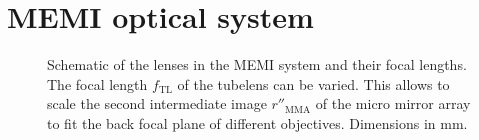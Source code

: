\section{MEMI optical system}
\begin{figure}
   \centering
   \def\svgscale{2}
   
   \caption{Schematic of the lenses in the MEMI system and their focal
     lengths. The focal length $f_\textrm{TL}$ of the tubelens can be
     varied. This allows to scale the second intermediate image
     $r''_\textrm{MMA}$ of the micro mirror array to fit the back
     focal plane of different objectives. Dimensions in mm.}
   \label{fig:memi-sketch}
 \end{figure}
 